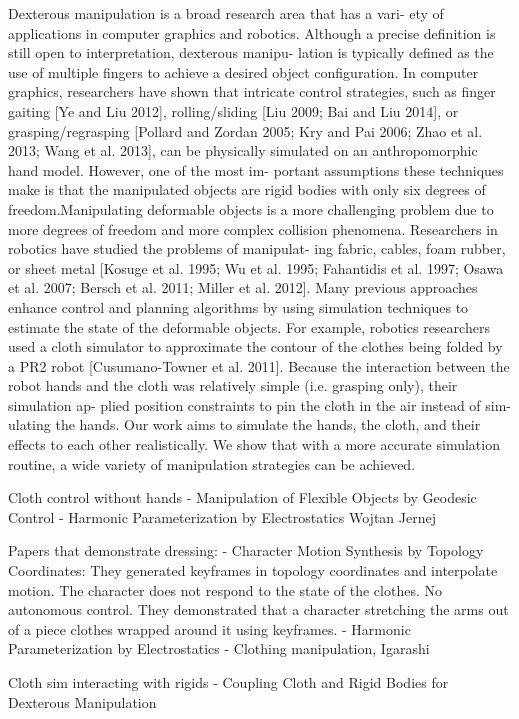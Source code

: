 Dexterous manipulation is a broad research area that has a vari- ety of applications in computer graphics and robotics. Although a precise definition is still open to interpretation, dexterous manipu- lation is typically defined as the use of multiple fingers to achieve a desired object configuration. In computer graphics, researchers have shown that intricate control strategies, such as finger gaiting [Ye and Liu 2012], rolling/sliding [Liu 2009; Bai and Liu 2014], or grasping/regrasping [Pollard and Zordan 2005; Kry and Pai 2006; Zhao et al. 2013; Wang et al. 2013], can be physically simulated on an anthropomorphic hand model. However, one of the most im- portant assumptions these techniques make is that the manipulated objects are rigid bodies with only six degrees of freedom.Manipulating deformable objects is a more challenging problem due to more degrees of freedom and more complex collision phenomena. Researchers in robotics have studied the problems of manipulat- ing fabric, cables, foam rubber, or sheet metal [Kosuge et al. 1995; Wu et al. 1995; Fahantidis et al. 1997; Osawa et al. 2007; Bersch et al. 2011; Miller et al. 2012]. Many previous approaches enhance control and planning algorithms by using simulation techniques to estimate the state of the deformable objects. For example, robotics researchers used a cloth simulator to approximate the contour of the clothes being folded by a PR2 robot [Cusumano-Towner et al. 2011]. Because the interaction between the robot hands and the cloth was relatively simple (i.e. grasping only), their simulation ap- plied position constraints to pin the cloth in the air instead of sim- ulating the hands. Our work aims to simulate the hands, the cloth, and their effects to each other realistically. We show that with a more accurate simulation routine, a wide variety of manipulation strategies can be achieved.


Cloth control without hands
- Manipulation of Flexible Objects by Geodesic Control
- Harmonic Parameterization by Electrostatics
Wojtan
Jernej


Papers that demonstrate dressing:
- Character Motion Synthesis by Topology Coordinates: They generated keyframes in topology coordinates and interpolate motion. The character does not respond to the state of the clothes. No autonomous control. They demonstrated that a character stretching the arms out of a piece clothes wrapped around it using keyframes. 
- Harmonic Parameterization by Electrostatics
- Clothing manipulation, Igarashi


Cloth sim interacting with rigids
- Coupling Cloth and Rigid Bodies for Dexterous Manipulation
